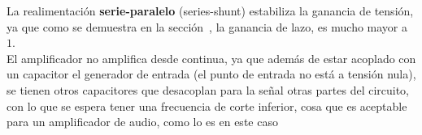 La realimentación \textbf{serie-paralelo} (series-shunt) estabiliza la ganancia de tensión, ya que como se demuestra en la sección~, la ganancia de lazo, es mucho mayor a $1$.\\

El amplificador no amplifica desde continua, ya que además de estar acoplado con un capacitor el generador de entrada (el punto de entrada no está a tensión nula), se tienen otros capacitores que desacoplan para la señal otras partes del circuito, con lo que se espera tener una frecuencia de corte inferior, cosa que es aceptable para un amplificador de audio, como lo es en este caso




\normalfont

